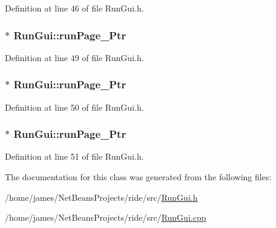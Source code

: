 Definition at line 46 of file Run\-Gui.\-h.

\hypertarget{class_run_gui_aa52f64156c00bbd4e14c46b8113e3072}{
\subsubsection[{run\-Page\-\_\-1\-Ptr}]{$\ast$ Run\-Gui\-::run\-Page\-\_\-Ptr\hspace{0.3cm}{\ttfamily [private]}}}\label{class_run_gui_aa52f64156c00bbd4e14c46b8113e3072}


Definition at line 49 of file Run\-Gui.\-h.

\hypertarget{class_run_gui_a86764c1a0c9629fbce62c7cb13c5ee07}{
\subsubsection[{run\-Page\-\_\-2\-Ptr}]{$\ast$ Run\-Gui\-::run\-Page\-\_\-Ptr\hspace{0.3cm}{\ttfamily [private]}}}\label{class_run_gui_a86764c1a0c9629fbce62c7cb13c5ee07}


Definition at line 50 of file Run\-Gui.\-h.

\hypertarget{class_run_gui_a7306b4df6c8619a98da052935a021cf8}{
\subsubsection[{run\-Page\-\_\-3\-Ptr}]{$\ast$ Run\-Gui\-::run\-Page\-\_\-Ptr\hspace{0.3cm}{\ttfamily [private]}}}\label{class_run_gui_a7306b4df6c8619a98da052935a021cf8}


Definition at line 51 of file Run\-Gui.\-h.



The documentation for this class was generated from the following files\-:\begin{DoxyCompactItemize}
\item 
/home/james/\-Net\-Beans\-Projects/ride/src/\hyperlink{_run_gui_8h}{Run\-Gui.\-h}\item 
/home/james/\-Net\-Beans\-Projects/ride/src/\hyperlink{_run_gui_8cpp}{Run\-Gui.\-cpp}\end{DoxyCompactItemize}
